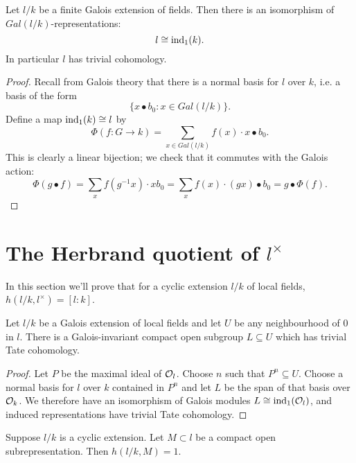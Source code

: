 \begin{theorem}\label{thm:additive field trivial}
	Let $l/k$ be a finite Galois extension of fields.
	Then there is an isomorphism of $Gal(l/k)$-representations:
	\[
		l \cong \mathrm{ind}_1(k).
	\]
	In particular $l$ has trivial cohomology.
\end{theorem}

\begin{proof}
	Recall from Galois theory that there is a normal basis for $l$ over $k$, i.e. a basis of the
	form
	\[
		\{x \bullet b_0 : x \in Gal(l/k)\}.
	\]
	Define a map $\mathrm{ind}_1(k) \cong l$ by
	\[
		\Phi (f : G \to k) = \sum_{x \in Gal(l/k)} f(x) \cdot x \bullet b_0.
	\]
	This is clearly a linear bijection; we check that it commutes with the Galois action:
	\[
		\Phi(g\bullet f)
		= \sum_x f(g^{-1}x) \cdot x b_0
		= \sum_x f(x) \cdot (gx) \bullet b_0
		= g \bullet \Phi(f).
	\]
\end{proof}






\section{The Herbrand quotient of \texorpdfstring{$l^{\times}$}{l*}}

In this section we'll prove that for a cyclic extension $l/k$ of local fields,
$h(l/k,l^\times) = [l:k]$.

\begin{lemma}
	\label{lem:exists additive trivial}
	Let $l/k$ be a Galois extension of local fields and
	let $U$ be any neighbourhood of $0$ in $l$.
	There is a Galois-invariant compact open subgroup $L \subseteq U$
	which has trivial Tate cohomology.
\end{lemma}

\begin{proof}
	Let $P$ be the maximal ideal of ${\mathcal O}_l$.
	Choose $n$ such that $P^n \subseteq U$.
	Choose a normal basis for $l$ over $k$ contained in $P^n$
	and let $L$ be the span of that basis over ${\mathcal O}_k$.
	We therefore have an isomorphism of Galois modules $L \cong \mathrm{ind}_1({\mathcal O}_l)$,
	and induced representations have trivial Tate cohomology.
\end{proof}

\begin{lemma} \label{lem:herbrand compact open additive}
	Suppose $l/k$ is a cyclic extension.
	Let $M \subset l$ be a compact open subrepresentation.
	Then $h(l/k,M)=1$.
\end{lemma}


